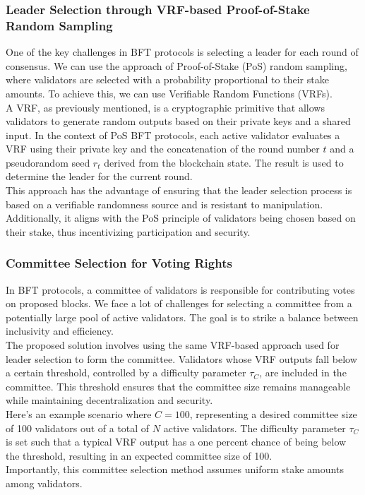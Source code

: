 \subsubsection{Leader Selection through VRF-based Proof-of-Stake Random Sampling}
One of the key challenges in BFT protocols is selecting a leader for each round of consensus. We can use the approach of Proof-of-Stake (PoS) random sampling, where validators are selected with a probability proportional to their stake amounts. To achieve this, we can use Verifiable Random Functions (VRFs).\\
A VRF, as previously mentioned, is a cryptographic primitive that allows validators to generate random outputs based on their private keys and a shared input. In the context of PoS BFT protocols, each active validator evaluates a VRF using their private key and the concatenation of the round number $t$ and a pseudorandom seed $r_t$ derived from the blockchain state. The result is used to determine the leader for the current round.\\
This approach has the advantage of ensuring that the leader selection process is based on a verifiable randomness source and is resistant to manipulation. Additionally, it aligns with the PoS principle of validators being chosen based on their stake, thus incentivizing participation and security.

\subsubsection{Committee Selection for Voting Rights}
In BFT protocols, a committee of validators is responsible for contributing votes on proposed blocks. We face a lot of challenges for selecting a committee from a potentially large pool of active validators. The goal is to strike a balance between inclusivity and efficiency.\\
The proposed solution involves using the same VRF-based approach used for leader selection to form the committee. Validators whose VRF outputs fall below a certain threshold, controlled by a difficulty parameter $\tau_{C}$, are included in the committee. This threshold ensures that the committee size remains manageable while maintaining decentralization and security.\\
Here's an example scenario where $C = 100$, representing a desired committee size of 100 validators out of a total of $N$ active validators. The difficulty parameter $\tau_{C}$ is set such that a typical VRF output has a one percent chance of being below the threshold, resulting in an expected committee size of 100.\\
Importantly, this committee selection method assumes uniform stake amounts among validators.

